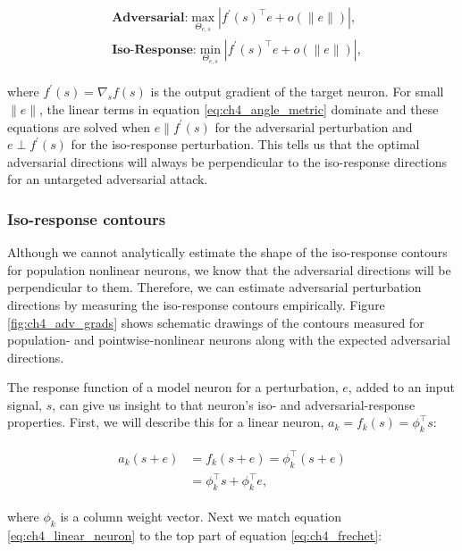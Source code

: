 \begin{align}\label{eq:ch4_angle_metric}
\begin{split}
    &\textbf{Adversarial:} \max_{\Theta_{e,s}} |f^{\prime}(s)^\top e + o(\|e\|)|,\\
    &\textbf{Iso-Response:} \min_{\Theta_{e,s}} |f^{\prime}(s)^\top e + o(\|e\|)|,
\end{split}
\end{align}

where $f^{\prime}(s) = \nabla_{s}f(s)$ is the output gradient of the target neuron. For small $\|e\|$, the linear terms in equation \eqref{eq:ch4_angle_metric} dominate and these equations are solved when $e \parallel f^{\prime}(s)$ for the adversarial perturbation and $e \perp f^{\prime}(s)$ for the iso-response perturbation. This tells us that the optimal adversarial directions will always be perpendicular to the iso-response directions for an untargeted adversarial attack. 

\subsubsection{Iso-response contours}
Although we cannot analytically estimate the shape of the iso-response contours for population nonlinear neurons, we know that the adversarial directions will be perpendicular to them. Therefore, we can estimate adversarial perturbation directions by measuring the iso-response contours empirically. Figure \ref{fig:ch4_adv_grads} shows schematic drawings of the contours measured for population- and pointwise-nonlinear neurons along with the expected adversarial directions.

The response function of a model neuron for a perturbation, $e$, added to an input signal, $s$, can give us insight to that neuron's iso- and adversarial-response properties. First, we will describe this for a linear neuron, $a_{k}=f_{k}(s)=\phi_{k}^\top s$:

\begin{align}\label{eq:ch4_linear_neuron}
\begin{split}
    a_{k}(s+e) &= f_{k}(s+e) = \phi_{k}^\top (s + e) \\
    &= \phi_{k}^\top s +\phi_{k}^\top e,
\end{split}
\end{align}

where $\phi_{k}$ is a column weight vector. Next we match equation \eqref{eq:ch4_linear_neuron} to the top part of equation \eqref{eq:ch4_frechet}:

